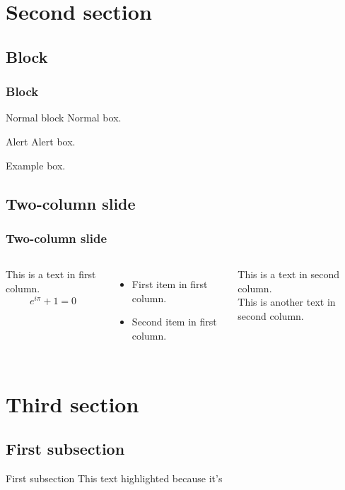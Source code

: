\documentclass[10pt]{beamer}
\begin{document}
\section{Second section}
\subsection{Block}
\begin{frame}
    \frametitle{Block}
    \begin{block}{Normal block}
        Normal box.
    \end{block} 
        
    \begin{alertblock}{Alert}
        Alert box.
    \end{alertblock}
        
    \begin{examples}
        Example box.
    \end{examples}
\end{frame}
    
\subsection{Two-column slide}
\begin{frame}
    \frametitle{Two-column slide}
    \begin{columns}
    This is a text in first column. \[  e^{i\pi} + 1 = 0 \]
        \begin{itemize}
            \item First item in first column.
            \item Second item in first column.
        \end{itemize}
    
    This is a text in second column. \\
    This is another text in second column. 
    \end{columns}
\end{frame}

\section{Third section}
\subsection{First subsection}
\begin{frame}{First subsection}
    \alert{This text highlighted} because it's \color{ocean}{important.}
\end{frame}
\end{document}
